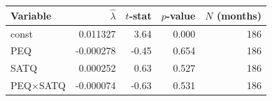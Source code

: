 \begin{tabular}{lrrrr}
\toprule
Variable & $\hat{\lambda}$ & $t$-stat & $p$-value & $N$ (months) \\
\midrule
const & 0.011327 & 3.64 & 0.000 & 186 \\
PEQ & -0.000278 & -0.45 & 0.654 & 186 \\
SATQ & 0.000252 & 0.63 & 0.527 & 186 \\
PEQ$\times$SATQ & -0.000074 & -0.63 & 0.531 & 186 \\
\bottomrule
\end{tabular}